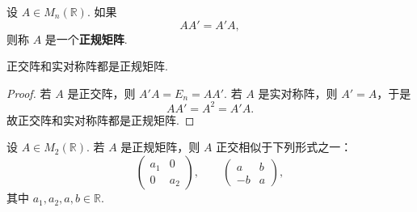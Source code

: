 \begin{definition}
	设 $A\in M_n(\mathbb{R})$. 如果
	\[
	AA'=A'A,
	\]
	则称 $A$ 是一个\textbf{正规矩阵}.
\end{definition}

\begin{example}
	正交阵和实对称阵都是正规矩阵.
\end{example}
\begin{proof}
	若 $A$ 是正交阵，则 $A'A=E_n=AA'$. 若 $A$ 是实对称阵，则 $A'=A$，于是
	\[
	AA'=A^2=A'A.
	\]
	故正交阵和实对称阵都是正规矩阵.
\end{proof}




\begin{lemma}
	设 $A\in M_2(\mathbb{R})$. 若 $A$ 是正规矩阵，则 $A$ 正交相似于下列形式之一：
	\[
	\begin{pmatrix}
		a_1&0\\
		0&a_2
	\end{pmatrix},
	\qquad
	\begin{pmatrix}
		a&b\\
		-b&a
	\end{pmatrix},
	\]
	其中 $a_1,a_2,a,b\in\mathbb{R}$.
\end{lemma}

